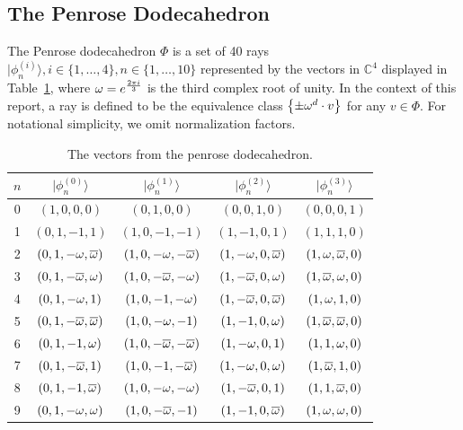 \subsection{The Penrose Dodecahedron}
The Penrose dodecahedron $\Phi$ is a set of 40 rays $|\phi_n^{(i)} \rangle, i \in \{1, \dots, 4\}, n \in \{1, \dots, 10\}$
represented by the vectors in $\mathbb{C}^4$ displayed in Table~\ref{tab:penrose},
where $\omega = e^{\frac{2\pi i}{3}}$ is the third complex root of unity.
In the context of this report, a ray is defined to be the equivalence class
$\left\{ \pm\omega^d \cdot v \right\}$ for any $v \in \Phi$. 
For notational simplicity, we omit normalization factors.
\begin{table}[h]
    \centering
    \caption{The vectors from the penrose dodecahedron.}\label{tab:penrose}
    \begin{tabular}{|c|c|c|c|c|}
        \hline
        $n$ & $|\phi^{(0)}_n\rangle$ & $|\phi^{(1)}_n\rangle$ & $|\phi^{(2)}_n\rangle$ & $|\phi^{(3)}_n\rangle$ \\
        \hline
        0 & $(1,0,0,0)$ &       $(0,1,0,0)$ &       $(0,0,1,0)$         & $(0,0,0,1)$ \\
        \hline
        1& $(0,1,-1,1)$ &      $(1,0,-1,-1)$ &     $(1,-1,0,1)$        & $(1,1,1,0)$ \\    
        2& $(0,1,-\omega,\overline{\omega})$ &   $(1,0,-\omega,-\overline{\omega})$ &  $(1,-\omega,0,\overline{\omega})$     & $(1,\omega,\overline{\omega},0)$ \\    
        3& $(0,1,-\overline{\omega},\omega)$ &   $(1,0,-\overline{\omega},-\omega)$ &  $(1,-\overline{\omega},0,\omega)$     & $(1,\overline{\omega},\omega,0)$ \\    
        \hline
        4& $(0,1,-\omega,1)$ &     $(1,0,-1,-\omega)$ &    $(1,-\overline{\omega},0,\overline{\omega})$    & $(1,\omega,1,0)$ \\    
        5& $(0,1,-\overline{\omega},\overline{\omega})$ &  $(1,0,-\omega,-1)$ &    $(1,-1,0,\omega)$       & $(1,\overline{\omega},\overline{\omega},0)$ \\    
        6& $(0,1,-1,\omega)$ &     $(1,0,-\overline{\omega},-\overline{\omega})$ & $(1,-\omega,0,1)$       & $(1,1,\omega,0)$ \\    
        \hline
        7& $(0,1,-\overline{\omega},1)$ &    $(1,0,-1,-\overline{\omega})$ &   $(1,-\omega,0,\omega)$      & $(1,\overline{\omega},1,0)$ \\    
        8& $(0,1,-1,\overline{\omega})$ &    $(1,0,-\omega,-\omega)$ &   $(1,-\overline{\omega},0,1)$      & $(1,1,\overline{\omega},0)$ \\    
        9& $(0,1,-\omega,\omega)$ &    $(1,0,-\overline{\omega},-1)$ &   $(1,-1,0,\overline{\omega})$      & $(1,\omega,\omega,0)$ \\    
        \hline
    \end{tabular}
\end{table}




